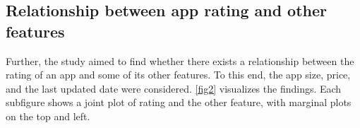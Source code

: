 \documentclass{article}
\begin{document}
\subsection{Relationship between app rating and other features}

Further, the study aimed to find whether there exists a relationship between the rating of an app and some of its other features. To this end, the app size, price, and the last updated date were considered. \cref{fig2} visualizes the findings. Each subfigure shows a joint plot of rating and the other feature, with marginal plots on the top and left. 


\begin{figure}[h]\centering
{}\hfill
{}\par 
{}

\end{figure}
\end{document}
